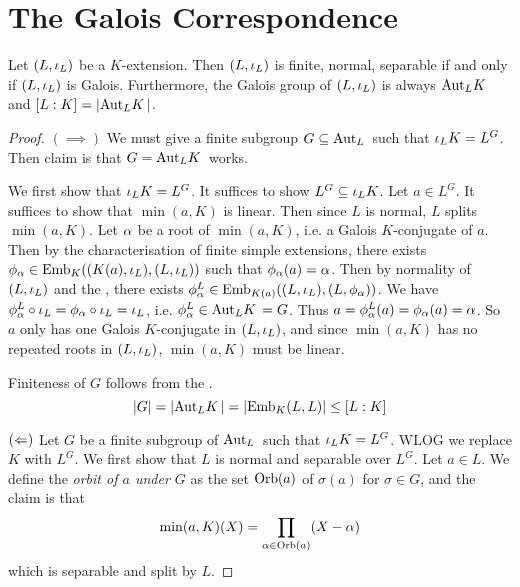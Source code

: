 \documentclass[main.tex]{subfiles}
\begin{document}
\section{The Galois Correspondence}

\begin{thm} 
  
  Let $(L,\io_L)$ be a $K$-extension.
  Then $(L,\io_L)$ is finite, normal, separable if and only if 
  $(L,\io_L)$ is Galois. 
  Furthermore, the Galois group of $(L,\io_L)$ is always $\aut{K}{L}$
  and $[L : K] = |\aut{K}{L}|$. 

\end{thm}
\begin{proof}
  $(\implies)$ We must give a finite subgroup $G \subseteq \aut{}{L}$
  such that $\io_L K = L^G$. 
  Then claim is that $G = \aut{K}{L}$ works. 

  We first show that $\io_L K = L^G$. 
  It suffices to show $L^G \subseteq \io_L K$. 
  Let $a \in L^G$. It suffices to show that $\min(a,K)$ is linear. 
  Then since $L$ is normal, $L$ splits $\min(a,K)$. 
  Let $\al$ be a root of $\min(a,K)$, i.e. a Galois $K$-conjugate of $a$. 
  Then by the 
  {characterisation of finite simple extensions}, 
  there exists $\phi_\al \in \emb{K}{(K(a),\io_L)}{(L,\io_L)}$
  such that $\phi_\al(a) = \al$. 
  Then by normality of $(L,\io_L)$ and 
  the , 
  there exists $\phi_\al^L \in \emb{K(a)}{(L,\io_L)}{(L,\phi_\al)}$. 
  We have $\phi_\al^L \circ \io_L = \phi_\al \circ \io_L = \io_L$,
  i.e. $\phi_\al^L \in \aut{K}{L} = G$. 
  Thus $a = \phi_\al^L(a) = \phi_\al(a) = \al$. 
  So $a$ only has one Galois $K$-conjugate in $(L,\io_L)$,
  and since $\min(a,K)$ has no repeated roots in $(L,\io_L)$,
  $\min(a,K)$ must be linear. 

  Finiteness of $G$ follows from 
  the .
  \[ |G| = |\aut{K}{L}| = |\emb{K}{L}{L}| \leq [L : K] \]

  $(\limplies)$ Let $G$ be a finite subgroup of $\aut{}{L}$ such that 
  $\io_L K = L^G$. 
  WLOG we replace $K$ with $L^G$. 
  We first show that $L$ is normal and separable over $L^G$. 
  Let $a \in L$. 
  We define the \emph{orbit of $a$ under $G$} as the set 
  $\Orb(a)$ of $\sigma(a)$ for $\sigma \in G$,
  and the claim is that 
  \[ \min(a,K)(X) = \prod_{\al \in \Orb(a)} (X - \al) \]
  which is separable and split by $L$. 


\end{proof}
\end{document}
